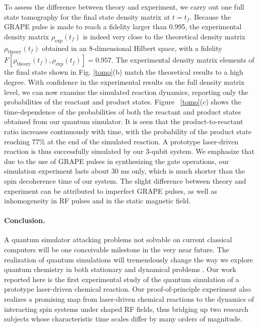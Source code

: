 \documentclass[prl,twocolumn,showpacs]{revtex4}
\begin{document}
 To assess the difference between theory and experiment,  we carry out one full state tomography for the final state density matrix  at $t=t_f$.
 Because the GRAPE pulse is made to reach a fidelity larger than 0.995, the experimental density matrix $\rho_{\text{exp}}(t_f)$
 is indeed very close to the  theoretical density matrix $\rho_{\text{theory}}(t_f)$ obtained in an 8-dimensional Hilbert space, with a fidelity $F[\rho_{\text{theory}}(t_f),\rho_{\text{exp}}(t_f)]=0.957$. The experimental density matrix elements of the final state shown in Fig. \ref{tomo}(b) match the theoretical results to a high degree. With confidence in the experimental results on the full density matrix level, we can now examine the simulated reaction dynamics, reporting only the probabilities of the reactant and product states.
 Figure~ \ref{tomo}(c) shows the time-dependence of the probabilities of both the reactant and product states obtained from our quantum simulator.
 It is seen that the product-to-reactant ratio
  increases continuously with time, with the probability of the product state reaching 77\% at the end of the simulated reaction.
    A prototype laser-driven reaction is thus successfully simulated by our 3-qubit system.
    We emphasize that due to the use of GRAPE pulses in synthesizing the gate operations, our simulation experiment lasts about 30 ms only, which is much shorter than the spin decoherence time of our system.
  The slight difference between theory and experiment can be attributed to imperfect GRAPE pulses, as well as inhomogeneity in RF pulses and in the static magnetic field.

\paragraph*{Conclusion.}

   A quantum simulator attacking problems not solvable on current classical computers will be one conceivable milestone in the very near future. The realization of quantum simulations will tremendously change the way we explore quantum chemistry in both stationary and dynamical problems \cite{static,dynamical}.   %
  Our work reported here is the first experimental study of the quantum simulation of a prototype laser-driven chemical reaction.
Our proof-of-principle experiment also realizes a promising map from laser-driven chemical reactions to the dynamics of interacting spin systems under shaped RF fields, thus bridging up two research subjects whose characteristic time scales differ by many orders of magnitude.
\end{document}
